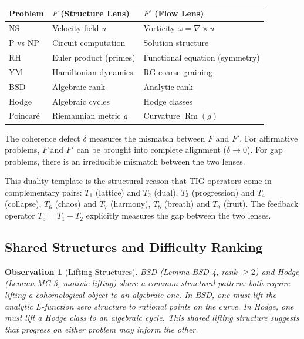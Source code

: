 \documentclass[11pt]{article}
\newtheorem{observation}[theorem]{Observation}
\DeclareMathOperator{\Rm}{Rm}
\begin{document}
\begin{center}
\begin{tabular}{@{}lll@{}}
\toprule
Problem & $F$ (Structure Lens) & $F'$ (Flow Lens) \\
\midrule
NS & Velocity field $u$ & Vorticity $\omega = \nabla \times u$ \\
P vs NP & Circuit computation & Solution structure \\
RH & Euler product (primes) & Functional equation (symmetry) \\
YM & Hamiltonian dynamics & RG coarse-graining \\
BSD & Algebraic rank & Analytic rank \\
Hodge & Algebraic cycles & Hodge classes \\
Poincar\'e & Riemannian metric $g$ & Curvature $\Rm(g)$ \\
\bottomrule
\end{tabular}
\end{center}

\noindent
The coherence defect $\delta$ measures the mismatch between $F$ and
$F'$.  For affirmative problems, $F$ and $F'$ can be brought into
complete alignment ($\delta \to 0$).  For gap problems, there is an
irreducible mismatch between the two lenses.

This duality template is the structural reason that TIG operators
come in complementary pairs: $T_1$ (lattice) and $T_2$ (dual),
$T_3$ (progression) and $T_4$ (collapse), $T_6$ (chaos) and $T_7$
(harmony), $T_8$ (breath) and $T_9$ (fruit).  The feedback operator
$T_5 = T_1 - T_2$ explicitly measures the gap between the two lenses.

\subsection{Shared Structures and Difficulty Ranking}
\label{subsec:shared}

\begin{observation}[Lifting Structures]
BSD (Lemma BSD-4, rank $\geq 2$) and Hodge (Lemma MC-3, motivic
lifting) share a common structural pattern: both require lifting a
cohomological object to an algebraic one.  In BSD, one must lift
the analytic $L$-function zero structure to rational points on the
curve.  In Hodge, one must lift a Hodge class to an algebraic cycle.
This shared lifting structure suggests that progress on either problem
may inform the other.
\end{observation}
\end{document}
